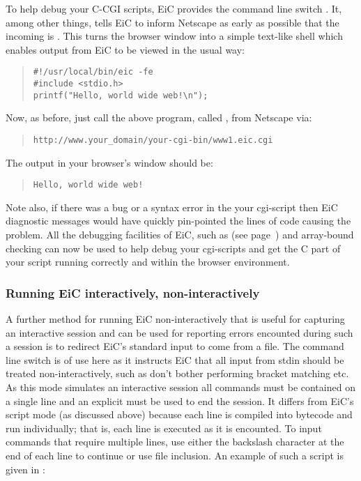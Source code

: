 To help debug your C-CGI scripts, EiC provides the command line switch
. It, among other things, tells EiC
to inform Netscape as early as possible that the incoming
 is . This turns the browser window 
into a simple text-like shell which enables output from EiC
to be viewed in the usual way:

\begin{quote}
\begin{verbatim}
#!/usr/local/bin/eic -fe 
#include <stdio.h>
printf("Hello, world wide web!\n");
\end{verbatim}
\end{quote}

Now, as before, just call the above program, called ,
from Netscape via:

\begin{quote}
\begin{verbatim}
http://www.your_domain/your-cgi-bin/www1.eic.cgi
\end{verbatim}
\end{quote}

The output in your browser's window should be:
\begin{quote}
\begin{verbatim}
Hello, world wide web!
\end{verbatim}
\end{quote}

Note also, if there was a bug or a syntax error in the your
cgi-script then EiC diagnostic messages would have quickly
pin-pointed the lines of code causing the problem. All the debugging
facilities of EiC, such as  (see page~\pageref{item:trace})
and array-bound checking can now be used to help debug your
cgi-scripts and get the C part of your script running correctly and
within the browser environment.


\subsubsection{Running EiC interactively, non-interactively}
\label{sec:ScriptMode2}

A further method for running EiC non-interactively that is useful for
capturing an interactive session and can be used for reporting errors
encounted during such a session is to redirect EiC's standard input to
come from a file. The command line switch  is of use here as it instructs EiC that all input from
stdin should be treated non-interactively, such as don't bother
performing bracket matching etc.  As this mode simulates an
interactive session all commands must be contained on a single line
and an explicit  must be used to end the session. It differs
from EiC's script mode (as discussed above) because each line is
compiled into bytecode and run individually; that is, each line is
executed as it is encounted. To input commands that require multiple
lines, use either the backslash character at the end of each line to
continue or use file inclusion. An example of such a script is given
in
:

